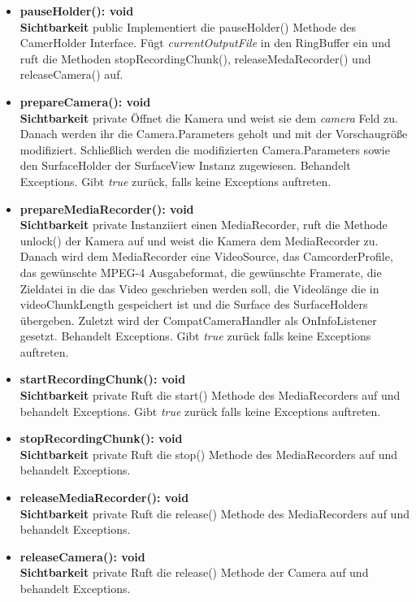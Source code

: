 \begin{itemize}
\item \textbf{pauseHolder(): void}\hfill\\
\textbf{Sichtbarkeit} public\newline
Implementiert die pauseHolder() Methode des CamerHolder Interface. Fügt \textit{currentOutputFile} in den RingBuffer ein und ruft die Methoden stopRecordingChunk(), releaseMedaRecorder() und releaseCamera() auf.

\item \textbf{prepareCamera(): void}\hfill\\
\textbf{Sichtbarkeit} private \newline
Öffnet die Kamera und weist sie dem \textit{camera} Feld zu. Danach werden ihr die Camera.Parameters geholt und mit der Vorschaugröße modifiziert. Schließlich werden die modifizierten Camera.Parameters sowie den SurfaceHolder der SurfaceView Instanz zugewiesen. Behandelt Exceptions. Gibt \textit{true} zurück, falls keine Exceptions auftreten.

\item \textbf{prepareMediaRecorder(): void}\hfill\\
\textbf{Sichtbarkeit} private \newline
Instanziiert einen MediaRecorder, ruft die Methode unlock() der Kamera auf und weist die Kamera dem MediaRecorder zu. Danach wird dem MediaRecorder eine VideoSource, das CamcorderProfile, das gewünschte MPEG-4 Ausgabeformat, die gewünschte Framerate, die Zieldatei in die das Video geschrieben werden soll, die Videolänge die in videoChunkLength gespeichert ist und die Surface des SurfaceHolders übergeben. Zuletzt wird der CompatCameraHandler als OnInfoListener gesetzt. Behandelt Exceptions. Gibt \textit{true} zurück falls keine Exceptions auftreten.

\item \textbf{startRecordingChunk(): void}\hfill\\
\textbf{Sichtbarkeit} private \newline
Ruft die start() Methode des MediaRecorders auf und behandelt Exceptions. Gibt \textit{true} zurück falls keine Exceptions auftreten.

\item \textbf{stopRecordingChunk(): void}\hfill\\
\textbf{Sichtbarkeit} private \newline
Ruft die stop() Methode des MediaRecorders auf und behandelt Exceptions.

\item \textbf{releaseMediaRecorder(): void}\hfill\\
\textbf{Sichtbarkeit} private \newline
Ruft die release() Methode des MediaRecorders auf und behandelt Exceptions.

\item \textbf{releaseCamera(): void}\hfill\\
\textbf{Sichtbarkeit} private \newline
Ruft die release() Methode der Camera auf und behandelt Exceptions.

\end{itemize}